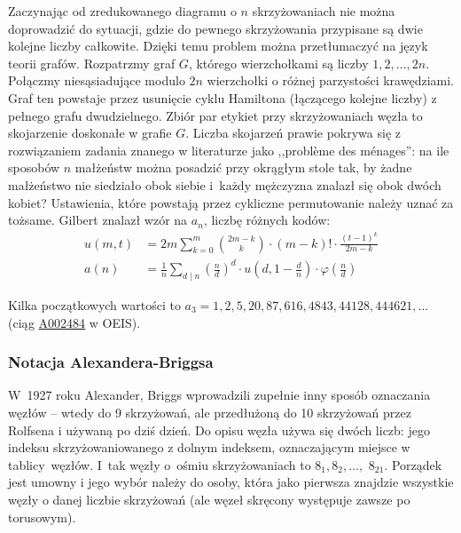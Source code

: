 Zaczynając od zredukowanego diagramu o $n$ skrzyżowaniach nie można doprowadzić do sytuacji, gdzie do pewnego skrzyżowania przypisane są dwie kolejne liczby całkowite.
Dzięki temu problem można przetłumaczyć na język teorii grafów.
Rozpatrzmy graf $G$, którego wierzchołkami są liczby $1, 2, \ldots, 2n$.
Połączmy niesąsiadujące modulo $2n$ wierzchołki o różnej parzystości krawędziami.
Graf ten powstaje przez usunięcie cyklu Hamiltona (łączącego kolejne liczby) z pełnego grafu dwudzielnego.
Zbiór par etykiet przy skrzyżowaniach węzła to skojarzenie doskonałe w grafie $G$.
Liczba skojarzeń prawie pokrywa się z rozwiązaniem zadania znanego w literaturze jako ,,problème des ménages'': na ile sposobów $n$ małżeństw można posadzić przy okrągłym stole tak, by żadne małżeństwo nie siedziało obok siebie i~każdy mężczyzna znalazł się obok dwóch kobiet?
Ustawienia, które powstają przez cykliczne permutowanie należy uznać za tożsame.
Gilbert \cite{gilbert1956} znalazł wzór na $a_n$, liczbę różnych kodów:
\begin{align}
u(m, t) & = 2m \sum_{k=0}^m {2m-k \choose k} \cdot (m-k)! \cdot \frac{(t-1)^k}{2m - k}  \\
a(n) & = \frac{1}{n} \sum_{d\mid n} \left(\frac{n}{d}\right)^d \cdot u \left(d, 1 - \frac{d}{n}\right) \cdot \varphi \left(\frac{n}{d}\right)
\end{align}

Kilka początkowych wartości to $a_3 = 1, 2, 5, 20, 87, 616, 4843, 44128, 444621, \ldots$ (ciąg \href{https://oeis.org/A002484}{A002484} w OEIS).

%

\subsubsection{Notacja Alexandera-Briggsa}
\label{sss:alexander_briggs}%
%
W~1927 roku Alexander, Briggs wprowadzili zupełnie inny sposób oznaczania węzłów -- wtedy do 9 skrzyżowań, ale przedłużoną do 10 skrzyżowań przez Rolfsena i używaną po dziś dzień.
Do opisu węzła używa się dwóch liczb: jego indeksu skrzyżowaniowanego z dolnym indeksem, oznaczającym miejsce w tablicy~węzłów.
I~tak węzły o~ośmiu skrzyżowaniach to $8_1, 8_2, \ldots,$ $8_{21}$.
Porządek jest umowny i jego wybór należy do osoby, która jako pierwsza znajdzie wszystkie węzły o danej liczbie skrzyżowań (ale węzeł skręcony występuje zawsze po torusowym).
%
%

